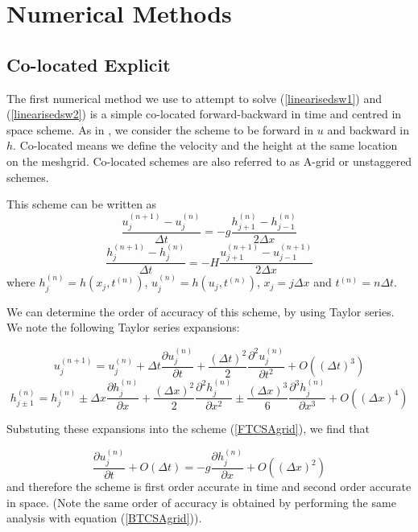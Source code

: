 \documentclass[a4paper,12pt, notitlepage]{article}
\begin{document}
\section{Numerical Methods}

\subsection {Co-located Explicit}
The first numerical method we use to attempt to solve (\ref{linearisedsw1}) and (\ref{linearisedsw2}) is a simple co-located forward-backward in time and centred in space scheme. As in \cite{MPE textbook}, we consider the scheme to be forward in $u$ and backward in $h$. Co-located means we define the velocity and the height at the same location on the meshgrid. Co-located schemes are also referred to as A-grid or unstaggered schemes.

This scheme can be written as 
\begin{equation} \label{FTCSAgrid}
\frac{u_{j}^{(n+1)} - u_{j}^{(n)}}{\Delta t} = -g \frac{h_{j+1}^{(n)} - h_{j-1}^{(n)}}{2\Delta x}
\end{equation}
\begin{equation}\label{BTCSAgrid}
\frac{h_{j}^{(n+1)} - h_{j}^{(n)}}{\Delta t} = -H \frac{u_{j+1}^{(n+1)} - u_{j-1}^{(n+1)}}{2\Delta x}
\end{equation}
where $h_{j}^{(n)} = h(x_{j}, t^{(n)})$, $u_{j}^{(n)} = h(u_{j}, t^{(n)})$, $x_{j} = j\Delta x$ and $t^{(n)} = n\Delta t$. 

We can determine the order of accuracy of this scheme, by using Taylor series. We note the following Taylor series expansions:

\begin{equation}\label{ujn+1}
u_{j}^{(n+ 1)} = u_{j}^{(n)} + \Delta t \frac{\partial u_{j}^{(n)}}{\partial t} + \frac{(\Delta t)^{2}}{2}\frac{\partial^{2} u_{j}^{(n)}}{\partial t^{2}} + O((\Delta t)^{3})
\end{equation}
\begin{equation}\label{hj+-1n}
h_{j \pm 1}^{(n)} = h_{j}^{(n)} \pm \Delta x  \frac{\partial h_{j}^{(n)}}{\partial x} + \frac{(\Delta x)^{2}}{2}\frac{\partial^{2} h_{j}^{(n)}}{\partial x^{2}} \pm \frac{(\Delta x)^{3}}{6}\frac{\partial^{3} h_{j}^{(n)}}{\partial x^{3}} + O((\Delta x)^{4})
\end{equation}

Substuting these expansions into the scheme (\ref{FTCSAgrid}), we find that 

\begin{equation}
\frac{\partial u_{j}^{(n)}}{\partial t} + O(\Delta t) =  -g \frac{\partial h_{j}^{(n)}}{\partial x} + O((\Delta x)^{2})
\end{equation} 
and therefore the scheme is first order accurate in time and second order accurate in space. (Note the same order of accuracy is obtained by performing the same analysis with equation (\ref{BTCSAgrid})).
\end{document}
